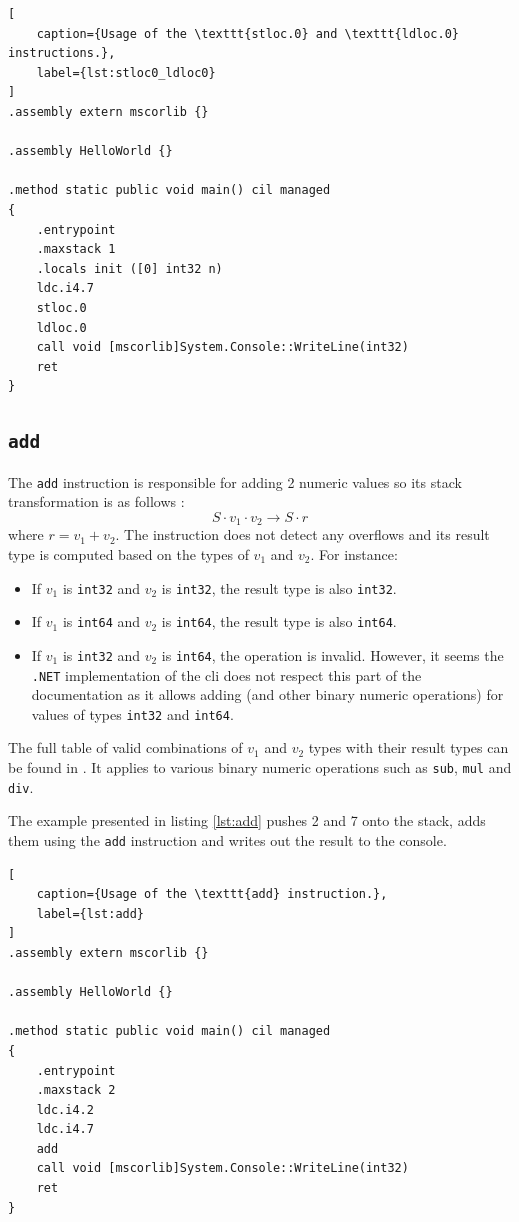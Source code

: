 \documentclass[declaration,shortabstract,english,mgr]{iithesis}
\begin{document}
\begin{lstlisting}[
	caption={Usage of the \texttt{stloc.0} and \texttt{ldloc.0} instructions.},
	label={lst:stloc0_ldloc0}
]
.assembly extern mscorlib {}

.assembly HelloWorld {}

.method static public void main() cil managed
{
	.entrypoint
	.maxstack 1
	.locals init ([0] int32 n)
	ldc.i4.7
	stloc.0
	ldloc.0
	call void [mscorlib]System.Console::WriteLine(int32)
	ret
}
\end{lstlisting}

\subsection{\texttt{add}}

The \texttt{add} instruction is responsible for adding 2 numeric values so its stack transformation is as follows \cite{ecmaStandard}:
$$
	S \cdot v_1 \cdot v_2 \rightarrow S \cdot r
$$
where $r = v_1 + v_2$. The instruction does not detect any overflows and its result type is computed based on the types of $v_1$ and $v_2$. For instance:
\begin{itemize}
	\item{If $v_1$ is \texttt{int32} and $v_2$ is \texttt{int32}, the result type is also \texttt{int32}.}
	\item{If $v_1$ is \texttt{int64} and $v_2$ is \texttt{int64}, the result type is also \texttt{int64}.}
	\item{If $v_1$ is \texttt{int32} and $v_2$ is \texttt{int64}, the operation is invalid. However, it seems the \texttt{.NET} implementation of the \acrshort{cli} does not respect this part of the documentation as it allows adding (and other binary numeric operations) for values of types \texttt{int32} and \texttt{int64}.}
\end{itemize}
The full table of valid combinations of $v_1$ and $v_2$ types with their result types can be found in \cite{ecmaStandard}. It applies to various binary numeric operations such as \texttt{sub}, \texttt{mul} and \texttt{div}.

The example presented in listing \ref{lst:add} pushes 2 and 7 onto the stack, adds them using the \texttt{add} instruction and writes out the result to the console.

\begin{lstlisting}[
	caption={Usage of the \texttt{add} instruction.},
	label={lst:add}
]
.assembly extern mscorlib {}

.assembly HelloWorld {}

.method static public void main() cil managed
{
	.entrypoint
	.maxstack 2
	ldc.i4.2
	ldc.i4.7
	add
	call void [mscorlib]System.Console::WriteLine(int32)
	ret
}
\end{lstlisting}
\end{document}
